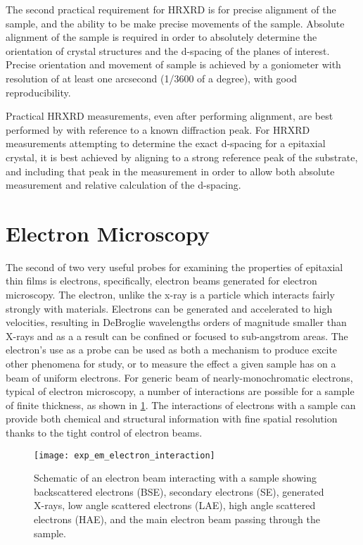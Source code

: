 The second practical requirement for HRXRD is for precise alignment of the sample, and the ability to be make precise movements of the sample. Absolute alignment of the sample is required in order to absolutely determine the orientation of crystal structures and the d-spacing of the planes of interest. Precise orientation and movement of sample is achieved by a goniometer with resolution of at least one arcsecond (1/3600 of a degree), with good reproducibility.

Practical HRXRD measurements, even after performing alignment, are best performed by with reference to a known diffraction peak. For HRXRD measurements attempting to determine the exact d-spacing for a epitaxial crystal, it is best achieved by aligning to a strong reference peak of the substrate, and including that peak in the measurement in order to allow both absolute measurement and relative calculation of the d-spacing.

\section{Electron Microscopy}
The second of two very useful probes for examining the properties of epitaxial thin films is electrons, specifically, electron beams generated for electron microscopy. The electron, unlike the x-ray is a particle which interacts fairly strongly with materials. Electrons can be generated and accelerated to high velocities, resulting in DeBroglie wavelengths orders of magnitude smaller than X-rays and as a a result can be confined or focused to sub-angstrom areas. The electron's use as a probe can be used as both a mechanism to produce excite other phenomena for study, or to measure the effect a given sample has on a beam of uniform electrons. For generic beam of nearly-monochromatic electrons, typical of electron microscopy, a number of interactions are possible for a sample of finite thickness, as shown in \cref{fig:exp_em_electron_interaction}. The interactions of electrons with a sample can provide both chemical and structural information with fine spatial resolution thanks to the tight control of electron beams.
\begin{figure}
    \centering
    \texttt{[image: exp\_em\_electron\_interaction]}
    \caption{\label{fig:exp_em_electron_interaction}Schematic of an electron beam interacting with a sample showing backscattered electrons (BSE), secondary electrons (SE), generated X-rays, low angle scattered electrons (LAE), high angle scattered electrons (HAE), and the main electron beam passing through the sample.}
\end{figure}

